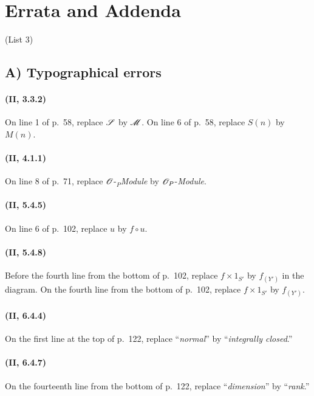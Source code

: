 \clearpage
{}
{}
\section*{Errata and Addenda}
\begin{center}\large (List 3)\end{center}

\subsection*{A) Typographical errors}

\paragraph{(\textbf{II}, 3.3.2)}
On line 1 of p.~58, replace $\mathscr{S}$ by $\mathscr{M}$.  On line 6 of p.~58,
replace $S(n)$ by $M(n)$.

\paragraph{(\textbf{II}, 4.1.1)}
On line 8 of p.~71, replace $\mathscr{O}$-${}_P$\emph{Module} by
$\mathscr{O}_P$-\emph{Module}.

\paragraph{(\textbf{II}, 5.4.5)}
On line 6 of p.~102, replace $u$ by $f\circ u$.

\paragraph{(\textbf{II}, 5.4.8)}
Before the fourth line from the bottom of p.~102, replace
$f\times 1_{S'}$ by $f_{(Y')}$ in the diagram.  On the fourth line from
the bottom of p.~102, replace $f\times 1_{S'}$ by $f_{(Y')}$.

\paragraph{(\textbf{II}, 6.4.4)}
On the first line at the top of p.~122, replace ``\emph{normal}'' by
``\emph{integrally closed}.''

\paragraph{(\textbf{II}, 6.4.7)}
On the fourteenth line from the bottom of p.~122, replace ``\emph{dimension}''
by ``\emph{rank}.''

